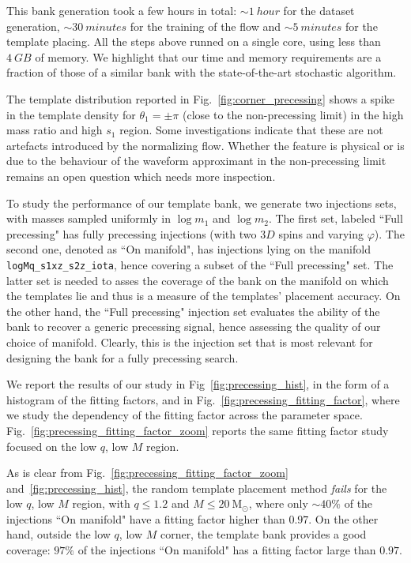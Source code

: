 \documentclass[twocolumn,showpacs,preprintnumbers,nofootinbib,prd,
superscriptaddress,10pt]{revtex4-2}
\begin{document}
This bank generation took a few hours in total: ${\sim \SI{1}{hour}}$ for the dataset generation, ${\sim \SI{30}{minutes}}$ for the training of the flow and ${\sim \SI{5}{minutes}}$ for the template placing.
All the steps above runned on a single core, using less than $\SI{4}{GB}$ of memory.
We highlight that our time and memory requirements are a fraction of those of a similar bank with the state-of-the-art stochastic algorithm.

The template distribution reported in Fig.~\ref{fig:corner_precessing} shows a spike in the template density for $\theta_1 = \pm\pi$ (close to the non-precessing limit) in the high mass ratio and high $s_1$ region. Some investigations indicate that these are not artefacts introduced by the normalizing flow.
Whether the feature is physical or is due to the behaviour of the waveform approximant in the non-precessing limit remains an open question which needs more inspection.

To study the performance of our template bank, we generate two injections sets, with masses sampled uniformly in $\log m_1$ and $\log m_2$.
The first set, labeled ``Full precessing" has fully precessing injections (with two $3D$ spins and varying $\varphi$). The second one, denoted as ``On manifold", has injections lying on the manifold \texttt{logMq\_s1xz\_s2z\_iota}, hence covering a subset of the ``Full precessing" set.
The latter set is needed to asses the coverage of the bank on the manifold on which the templates lie and thus is a measure of the templates' placement accuracy.
On the other hand, the ``Full precessing" injection set evaluates the ability of the bank to recover a generic precessing signal, hence assessing the quality of our choice of manifold.
Clearly, this is the injection set that is most relevant for designing the bank for a fully precessing search.

We report the results of our study in Fig~\ref{fig:precessing_hist}, in the form of a histogram of the fitting factors, and in Fig.~\ref{fig:precessing_fitting_factor}, where we study the dependency of the fitting factor across the parameter space.
Fig.~\ref{fig:precessing_fitting_factor_zoom} reports the same fitting factor study focused on the low $q$, low $M$ region.

As is clear from Fig.~\ref{fig:precessing_fitting_factor_zoom} and~\ref{fig:precessing_hist}, the random template placement method {\it fails} for the low $q$, low $M$ region, with $q \leq 1.2$ and $M \leq \SI{20}{\mathrm{M_\odot}}$, where only $\sim 40\%$ of the injections ``On manifold" have a fitting factor higher than $0.97$.
On the other hand, outside the low $q$, low $M$ corner, the template bank provides a good coverage: $97\%$ of the injections ``On manifold" has a fitting factor large than $0.97$.
\end{document}
